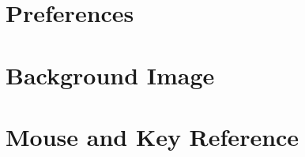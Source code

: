 	\section{Preferences}%
	\label{sec:ch_global_prefs}
	

	\section{Background Image}%
	\label{sec:ch_bg_image}
	

	\section{Mouse and Key Reference}%
	\label{sec:mouse_key_ref}
	



